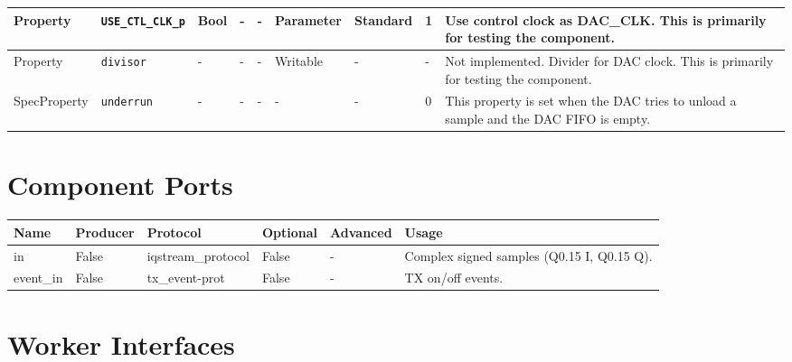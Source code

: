 \begin{landscape}
\begin{scriptsize}
\begin{tabular}{|p{2cm}|p{4cm}|p{1cm}|p{2cm}|p{2cm}|p{2cm}|p{2cm}|p{1cm}|p{3.95cm}|}
			\hline
			Property     & \verb+USE_CTL_CLK_p+ & Bool & -              & -               & Parameter     & Standard    & 1       & Use control clock as DAC\_CLK. This is primarily for testing the component.                                            \\
			\hline
			Property     & \verb+divisor+       & -    & -              & -               & Writable      & -           & -       & Not implemented. Divider for DAC clock. This is primarily for testing the component.                                   \\
			\hline
			SpecProperty & \verb+underrun+      & -    & -              & -               & -             & -           & 0       & This property is set when the DAC tries to unload a sample and the DAC FIFO is empty.                                  \\
			\hline
		\end{tabular}
	\end{scriptsize}

	\section*{Component Ports}
	\begin{scriptsize}
		\begin{tabular}{|p{2cm}|p{1.5cm}|p{4cm}|p{1.5cm}|p{1.5cm}|p{10.75cm}|}
			\hline
			\rowcolor{blue}
			Name & Producer & Protocol           & Optional & Advanced & Usage                  \\
			\hline
			in   & False    & iqstream\_protocol & False     & -        & Complex signed samples (Q0.15 I, Q0.15 Q). \\
			\hline
			event\_in & False & tx\_event-prot   & False     & -        & TX on/off events. \\
			\hline
		\end{tabular}
	\end{scriptsize}

	\section*{Worker Interfaces}

\end{landscape}
